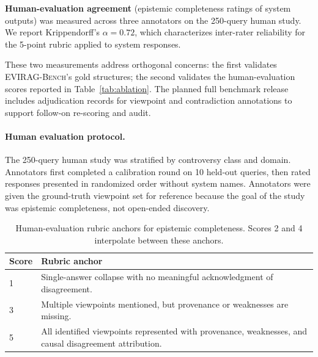 \documentclass[11pt]{article}
\newcommand{\bench}{\textsc{EVIRAG-Bench}\xspace}
\begin{document}
\textbf{Human-evaluation agreement} (epistemic completeness ratings of system
outputs) was measured across three annotators on the 250-query human study.
We report Krippendorff's $\alpha{=}0.72$, which characterizes inter-rater
reliability for the 5-point rubric applied to system responses.

These two measurements address orthogonal concerns: the first validates
\bench's gold structures; the second validates the human-evaluation scores
reported in Table~\ref{tab:ablation}.  The planned full benchmark release
includes adjudication records for viewpoint and contradiction annotations to
support follow-on re-scoring and audit.

\paragraph{Human evaluation protocol.}
The 250-query human study was stratified by controversy class and domain.
Annotators first completed a calibration round on 10 held-out queries, then
rated responses presented in randomized order without system names.  Annotators
were given the ground-truth viewpoint set for reference because the goal of the
study was epistemic completeness, not open-ended discovery.

\begin{table}[t]
\centering\small
\setlength{\tabcolsep}{5pt}
\begin{tabular}{@{}lp{5.3cm}@{}}
\toprule
\textbf{Score} & \textbf{Rubric anchor} \\
\midrule
1 & Single-answer collapse with no meaningful acknowledgment of disagreement. \\
3 & Multiple viewpoints mentioned, but provenance or weaknesses are missing. \\
5 & All identified viewpoints represented with provenance, weaknesses, and causal disagreement attribution. \\
\bottomrule
\end{tabular}
\caption{Human-evaluation rubric anchors for epistemic completeness.  Scores 2
and 4 interpolate between these anchors.}
\label{tab:rubric}
\end{table}
\end{document}
